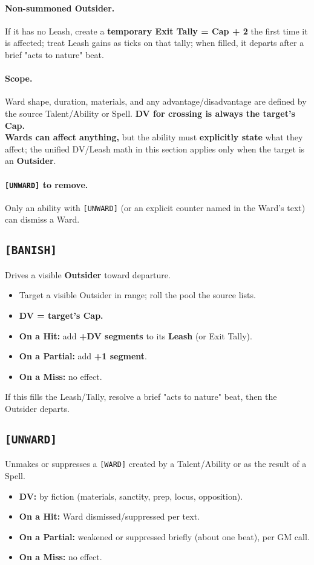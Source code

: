 \paragraph{Non-summoned Outsider.}
If it has no Leash, create a \textbf{temporary Exit Tally = Cap + 2} the first time it is affected; treat Leash gains as ticks on that tally; when filled, it departs after a brief "acts to nature" beat.

\paragraph{Scope.}
Ward shape, duration, materials, and any advantage/disadvantage are defined by the source Talent/Ability or Spell. \textbf{DV for crossing is always the target's Cap.} \\
\textbf{Wards can affect anything,} but the ability must \textbf{explicitly state} what they affect; the unified DV/Leash math in this section applies only when the target is an \textbf{Outsider}.

\paragraph{\texttt{[UNWARD]} to remove.}
Only an ability with \texttt{[UNWARD]} (or an explicit counter named in the Ward's text) can dismiss a Ward.

\subsection{\texttt{[BANISH]}}
Drives a visible \textbf{Outsider} toward departure.
\begin{itemize}
  \item Target a visible Outsider in range; roll the pool the source lists.
  \item \textbf{DV = target's Cap.}
  \item \textbf{On a Hit:} add \textbf{+DV segments} to its \textbf{Leash} (or Exit Tally).
  \item \textbf{On a Partial:} add \textbf{+1 segment}.
  \item \textbf{On a Miss:} no effect.
\end{itemize}
If this fills the Leash/Tally, resolve a brief "acts to nature" beat, then the Outsider departs.

\subsection{\texttt{[UNWARD]}}
Unmakes or suppresses a \texttt{[WARD]} created by a Talent/Ability or as the result of a Spell.
\begin{itemize}
  \item \textbf{DV:} by fiction (materials, sanctity, prep, locus, opposition).
  \item \textbf{On a Hit:} Ward dismissed/suppressed per text.
  \item \textbf{On a Partial:} weakened or suppressed briefly (about one beat), per GM call.
  \item \textbf{On a Miss:} no effect.
\end{itemize}

